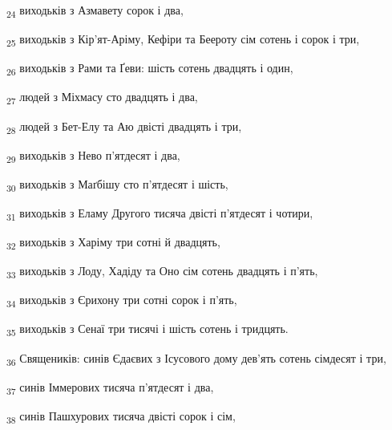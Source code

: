 \begin{tcolorbox}
\textsubscript{24} виходьків з Азмавету сорок і два,
\end{tcolorbox}
\begin{tcolorbox}
\textsubscript{25} виходьків з Кір'ят-Аріму, Кефіри та Беероту сім сотень і сорок і три,
\end{tcolorbox}
\begin{tcolorbox}
\textsubscript{26} виходьків з Рами та Ґеви: шість сотень двадцять і один,
\end{tcolorbox}
\begin{tcolorbox}
\textsubscript{27} людей з Міхмасу сто двадцять і два,
\end{tcolorbox}
\begin{tcolorbox}
\textsubscript{28} людей з Бет-Елу та Аю двісті двадцять і три,
\end{tcolorbox}
\begin{tcolorbox}
\textsubscript{29} виходьків з Нево п'ятдесят і два,
\end{tcolorbox}
\begin{tcolorbox}
\textsubscript{30} виходьків з Маґбішу сто п'ятдесят і шість,
\end{tcolorbox}
\begin{tcolorbox}
\textsubscript{31} виходьків з Еламу Другого тисяча двісті п'ятдесят і чотири,
\end{tcolorbox}
\begin{tcolorbox}
\textsubscript{32} виходьків з Харіму три сотні й двадцять,
\end{tcolorbox}
\begin{tcolorbox}
\textsubscript{33} виходьків з Лоду, Хадіду та Оно сім сотень двадцять і п'ять,
\end{tcolorbox}
\begin{tcolorbox}
\textsubscript{34} виходьків з Єрихону три сотні сорок і п'ять,
\end{tcolorbox}
\begin{tcolorbox}
\textsubscript{35} виходьків з Сенаї три тисячі і шість сотень і тридцять.
\end{tcolorbox}
\begin{tcolorbox}
\textsubscript{36} Священиків: синів Єдаєвих з Ісусового дому дев'ять сотень сімдесят і три,
\end{tcolorbox}
\begin{tcolorbox}
\textsubscript{37} синів Іммерових тисяча п'ятдесят і два,
\end{tcolorbox}
\begin{tcolorbox}
\textsubscript{38} синів Пашхурових тисяча двісті сорок і сім,
\end{tcolorbox}
